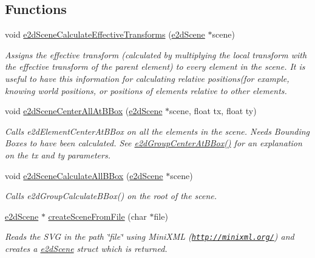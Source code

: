 \subsection*{Functions}
\begin{DoxyCompactItemize}
\item 
void \hyperlink{group__e2dScene_gac4b32991ff8bab5d5ae429fb97b4e26c}{e2d\-Scene\-Calculate\-Effective\-Transforms} (\hyperlink{structe2dScene}{e2d\-Scene} $\ast$scene)
\begin{DoxyCompactList}\small\item\em Assigns the effective transform (calculated by multiplying the local transform with the effective transform of the parent element) to every element in the scene. It is useful to have this information for calculating relative positions(for example, knowing world positions, or positions of elements relative to other elements. \end{DoxyCompactList}\item 
void \hyperlink{group__e2dScene_gab0487c3d83b8ae072a59286a9e8285c7}{e2d\-Scene\-Center\-All\-At\-B\-Box} (\hyperlink{structe2dScene}{e2d\-Scene} $\ast$scene, float tx, float ty)
\begin{DoxyCompactList}\small\item\em Calls e2d\-Element\-Center\-At\-B\-Box on all the elements in the scene. Needs Bounding Boxes to have been calculated. See \hyperlink{group__e2dGroup_ga04bf94419865ca7f9d6daf30ce3fadf0}{e2d\-Group\-Center\-At\-B\-Box()} for an explanation on the tx and ty parameters. \end{DoxyCompactList}\item 
void \hyperlink{group__e2dScene_ga205af7a04544273413431072ea5a22b9}{e2d\-Scene\-Calculate\-All\-B\-Box} (\hyperlink{structe2dScene}{e2d\-Scene} $\ast$scene)
\begin{DoxyCompactList}\small\item\em Calls e2d\-Group\-Calculate\-B\-Box() on the root of the scene. \end{DoxyCompactList}\item 
\hyperlink{structe2dScene}{e2d\-Scene} $\ast$ \hyperlink{group__e2dScene_gaa0d6ded282c46461357e619f04636416}{create\-Scene\-From\-File} (char $\ast$file)
\begin{DoxyCompactList}\small\item\em Reads the S\-V\-G in the path \char`\"{}file\char`\"{} using Mini\-X\-M\-L (\href{http://minixml.org/}{\tt http\-://minixml.\-org/}) and creates a \hyperlink{structe2dScene}{e2d\-Scene} struct which is returned. \end{DoxyCompactList}\end{DoxyCompactItemize}


